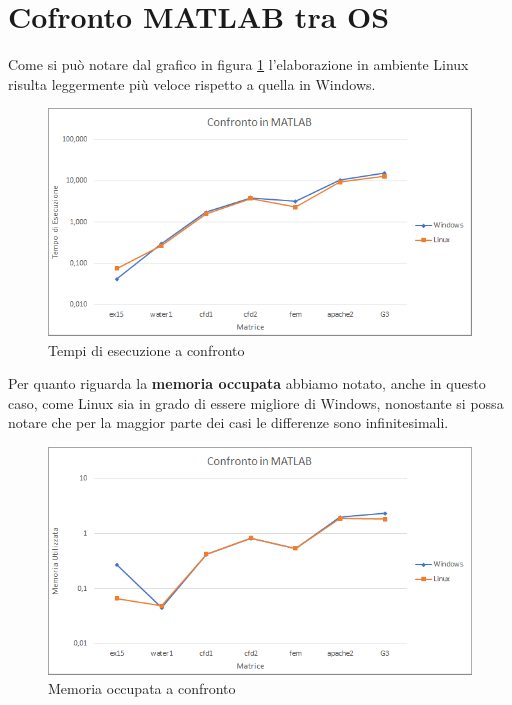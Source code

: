 \documentclass[a4paper,12pt,titlepage,oneside]{book}
\begin{document}
    \section{Cofronto MATLAB tra OS}
    \noindent Come si può notare dal grafico in figura \ref{plot:timemat} l'elaborazione in ambiente Linux risulta leggermente più veloce rispetto a quella in Windows.
    \begin{figure}[ht]
        \centering
        \includegraphics[scale=0.8]{src/plot/TimeMAT.png}
        \caption{Tempi di esecuzione a confronto}
        \label{plot:timemat}
    \end{figure}
    
    \noindent Per quanto riguarda la \textbf{memoria occupata} abbiamo notato, anche in questo caso, come Linux sia in grado di essere migliore di Windows, nonostante si possa notare che per la maggior parte dei casi le differenze sono infinitesimali.\\[0.5cm]
    
    \begin{figure}[ht]
        \centering
        \includegraphics[scale=0.8]{src/plot/MemMAT.png}
        \caption{Memoria occupata a confronto}
        \label{plot:memmat}
    \end{figure}
    
\end{document}
